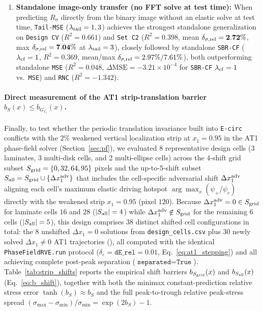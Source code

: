 \documentclass[preprint,11pt,a4paper]{elsarticle}
\begin{document}
\begin{enumerate}
    \item \textbf{Standalone image-only transfer (no FFT solve at test time):} When predicting $R_\sigma$ directly from the binary image without an elastic solve at test time, \texttt{Tail-MSE} ($\lambda_{\rm tail}=1,3$) achieves the strongest standalone generalization on \texttt{Design CV} ($R^2=\mathbf{0.661}$) and \texttt{Set C2} ($R^2=\mathbf{0.398}$, mean $\delta_{\sigma,\rm rel}=\mathbf{2.72\%}$, max $\delta_{\sigma,\rm rel}=\mathbf{7.04\%}$ at $\lambda_{\rm tail}=3$), closely followed by standalone \texttt{SBR-CF} ($\lambda_{\rm cf}=1$, $R^2=0.369$, mean/max $\delta_{\sigma,\rm rel}=2.97\%/7.61\%$), both outperforming standalone \texttt{MSE} ($R^2=0.048$, $\Delta\text{MSE}=-3.21\times 10^{-4}$ for \texttt{SBR-CF} $\lambda_{\rm cf}=1$ vs.\ \texttt{MSE}) and \texttt{RNC} ($R^2=-1.342$).
\end{enumerate}

\paragraph{Direct measurement of the AT1 strip-translation barrier $b_S(x)\le b_{G_{x_1}}(x)$.}
Finally, to test whether the periodic translation invariance built into \texttt{E-circ} conflicts with the $2\%$ weakened vertical localization strip at $x_1=0.95$ in the AT1 phase-field solver (Section~\ref{sec:pf}), we evaluated 8 representative design cells (3 laminates, 3 multi-disk cells, and 2 multi-ellipse cells) across the 4-shift grid subset $S_{\rm grid}=\{0, 32, 64, 95\}$ pixels and the up-to-5-shift subset $S_{\rm all}=S_{\rm grid}\cup\{\Delta x_1^{\rm adv}\}$ that includes the cell-specific adversarial shift $\Delta x_1^{\rm adv}$ aligning each cell's maximum elastic driving hotspot $\arg\max_x(\psi_+/\psi_c)$ directly with the weakened strip $x_1=0.95$ (pixel $120$). Because $\Delta x_1^{\rm adv}=0\in S_{\rm grid}$ for laminate cells $16$ and $28$ ($|S_{\rm all}|=4$) while $\Delta x_1^{\rm adv}\notin S_{\rm grid}$ for the remaining 6 cells ($|S_{\rm all}|=5$), this design comprises $38$ distinct shifted cell configurations in total: the $8$ unshifted $\Delta x_1=0$ solutions from \texttt{design\_cells.csv} plus $30$ newly solved $\Delta x_1\ne 0$ AT1 trajectories (), all computed with the identical \texttt{PhaseFieldRVE.run} protocol ($\delta_\varepsilon=\texttt{dE\_rel}=0.01$, Eq.~\eqref{eq:at1_stepping}) and all achieving complete post-peak separation ($\texttt{separated}=\texttt{True}$). Table~\ref{tab:strip_shifts} reports the empirical shift barriers $b_{S_{\rm grid}}(x)$ and $b_{S_{\rm all}}(x)$ (Eq.~\eqref{eq:b_shift}), together with both the minimax constant-prediction relative stress error $\tanh(b_S)\approx b_S$ and the full peak-to-trough relative peak-stress spread $(\sigma_{\max}-\sigma_{\min})/\sigma_{\min}=\exp(2b_S)-1$.
\end{document}
